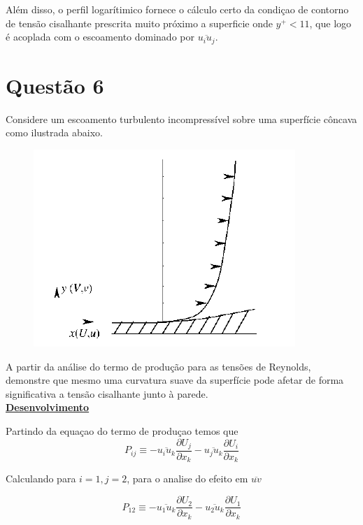 \documentclass[12pt]{article}
\begin{document}
Além disso, o perfil logarítimico fornece o cálculo certo da condiçao de contorno de tensão cisalhante prescrita  muito próximo a superficie onde $y^+ <11$, que logo é acoplada com o escoamento dominado por $\overline{u_i u_j}$.

\section*{Questão 6}

Considere um escoamento turbulento incompressível sobre uma superfície côncava como ilustrada abaixo.\\
\begin{figure}[H]
	\centering
	\includegraphics[width=.65\textwidth]{figures/2}
\end{figure}


A partir da análise do termo de produção para as tensões de Reynolds,  demonstre que mesmo uma curvatura suave da superfície pode afetar de forma significativa a tensão cisalhante junto à parede.\\

\textbf{\underline{Desenvolvimento}}

Partindo da equaçao do termo de produçao temos que 
\begin{equation}
	P_{ij} \equiv - \overline{u_i u_k} \frac{\partial U_j}{\partial x_k}
	- \overline{u_j u_k} \frac{\partial U_i}{\partial x_k}
\end{equation}

 	

Calculando para $i=1, j=2$, para o analise do efeito em $\overline{uv}$

\begin{equation}
	P_{12} \equiv - \overline{u_1 u_k} \frac{\partial U_2}{\partial x_k}
	- \overline{u_2 u_k} \frac{\partial U_1}{\partial x_k}
\end{equation}
\end{document}
